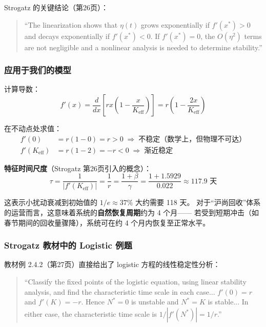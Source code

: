 \documentclass[12pt,a4paper]{article}
\begin{document}
Strogatz 的关键结论（第26页）：
\begin{quote}
\small
``The linearization shows that $\eta(t)$ grows exponentially if $f'(x^*) > 0$ and decays
exponentially if $f'(x^*) < 0$. If $f'(x^*) = 0$, the $O(\eta^2)$ terms are not negligible
and a nonlinear analysis is needed to determine stability.''
\end{quote}

\subsubsection{应用于我们的模型}

计算导数：
\begin{equation}
f'(x) = \frac{d}{dx}\left[ r x \left(1 - \frac{x}{K_{\text{eff}}}\right) \right]
       = r\left(1 - \frac{2x}{K_{\text{eff}}}\right)
\end{equation}

在不动点处求值：
\begin{align}
f'(0)      &= r\left(1 - 0\right) = r > 0
            \;\Rightarrow\; \text{不稳定（数学上，但物理不可达）} \\[4pt]
f'(K_{\text{eff}}) &= r\left(1 - 2\right) = -r < 0
            \;\Rightarrow\; \textbf{渐近稳定}
\end{align}

\textbf{特征时间尺度}（Strogatz 第26页引入的概念）：
\begin{equation}
\tau = \frac{1}{|f'(K_{\text{eff}})|} = \frac{1}{r} = \frac{1+\beta}{\gamma}
      = \frac{1+1.5929}{0.022} \approx 117.9 \text{ 天}
\end{equation}

这表示小扰动衰减到初始值的 $1/e \approx 37\%$ 大约需要 118 天。
对于``沪尚回收''体系的运营而言，这意味着系统的\textbf{自然恢复周期}约为 4 个月——
若受到短期冲击（如春节期间的回收量骤降），系统可在约 4 个月内恢复至正常水平。

\subsubsection{Strogatz 教材中的 Logistic 例题}
教材例 2.4.2（第27页）直接给出了 logistic 方程的线性稳定性分析：
\begin{quote}
\small
``Classify the fixed points of the logistic equation, using linear stability analysis, and find
the characteristic time scale in each case... $f'(0) = r$ and $f'(K) = -r$. Hence $N^* = 0$
is unstable and $N^* = K$ is stable... In either case, the characteristic time scale is
$1/|f'(N^*)| = 1/r$.''
\end{quote}
\end{document}
